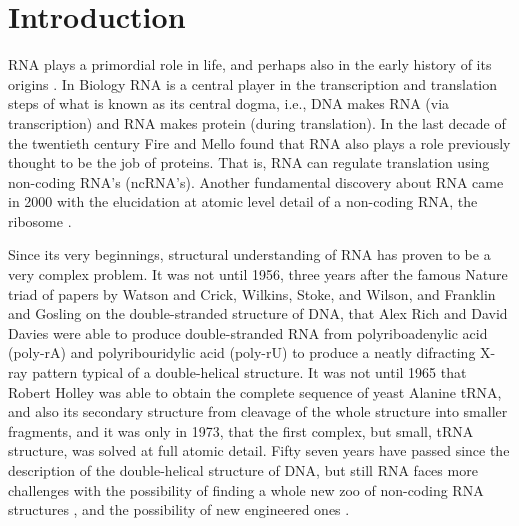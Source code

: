 \chapter{Introduction}
\label{introduction} 

RNA plays  a primordial role  in life, and  perhaps also in  the early
history   of  its   origins  \cite{woese1967,   crick1968,  orgel1968,
  orgel2004}. In Biology RNA is  a central player in the transcription
and translation steps of what is known as its central dogma, i.e., DNA
makes  RNA   (via  transcription)   and  RNA  makes   protein  (during
translation).
In  the  last   decade  of  the  twentieth  century   Fire  and  Mello
\cite{fire1998} found that RNA also plays a role previously thought to
be the  job of proteins. That  is, RNA can  regulate translation using
non-coding  RNA's (ncRNA's). Another  fundamental discovery  about RNA
came  in  2000  with the  elucidation  at  atomic  level detail  of  a
non-coding   RNA,    the   ribosome   \cite{schluenzen2000,   ban2000,
  wimberly2000}.

Since its very beginnings,  structural understanding of RNA has proven
to be a very complex problem. It was not until 1956, three years after
the famous Nature triad of papers by Watson and Crick, Wilkins, Stoke,
and  Wilson,  and  Franklin  and  Gosling  \cite{watson1953a,
  wilkins1953, franklin1953}  on  the
double-stranded structure of DNA, that Alex Rich and David Davies were
able  to  produce   double-stranded  RNA  from  polyriboadenylic  acid
(poly-rA)  and polyribouridylic  acid  (poly-rU) to  produce a  neatly
difracting X-ray pattern typical of a double-helical structure. It was
not  until 1965 that  Robert Holley  was able  to obtain  the complete
sequence of yeast Alanine tRNA,  and also its secondary structure from
cleavage of  the whole  structure into smaller  fragments, and  it was
only in 1973,  that the first complex, but  small, tRNA structure, was
solved at full atomic detail.  Fifty seven years have passed since the
description  of the  double-helical structure  of DNA,  but  still RNA
faces more challenges with the  possibility of finding a whole new zoo
of non-coding RNA  structures \cite{weinberg2009}, and the possibility
of new engineered ones \cite{severcan2009}.

